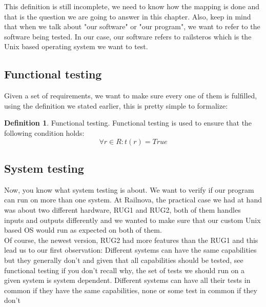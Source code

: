 \documentclass[12pt]{article}
\theoremstyle{definition}
\newtheorem{definition}{Definition}[section]
\theoremstyle{definition}
\theoremstyle{remark}
\begin{document}
This definition is still incomplete, we need to know how the mapping is done and that is the question we are going to answer in this chapter. Also, keep in mind that when we talk about "our software" or "our program", we want to refer to the software being tested. In our case, our software refers to \gls{railsteros} which is the Unix based operating system we want to test.



\subsection{Functional testing}


Given a set of requirements, we want to make sure every one of them is fulfilled, using the definition we stated earlier, this is pretty simple to formalize:

\theoremstyle{definition}
\begin{definition}{Functional testing.} Functional testing is used to ensure that the following condition holds:
$$\forall r \in R: t(r) = True$$
\end{definition}



\subsection{System testing}


Now, you know what system testing is about. We want to verify if our program can run on more than one system. At Railnova, the practical case we had at hand was about two different hardware, RUG1 and RUG2, both of them handles inputs and outputs differently and we wanted to make sure that our custom Unix based OS would run as expected on both of them.\\

Of course, the newest version, RUG2 had more features than the RUG1 and this lead us to our first observation: Different systems can have the same capabilities but they generally don't and given that all capabilities should be tested, see functional testing if you don't recall why, the set of tests we should run on a given system is system dependent. Different systems can have all their tests in common if they have the same capabilities, none or some test in common if they don't\\
\end{document}
